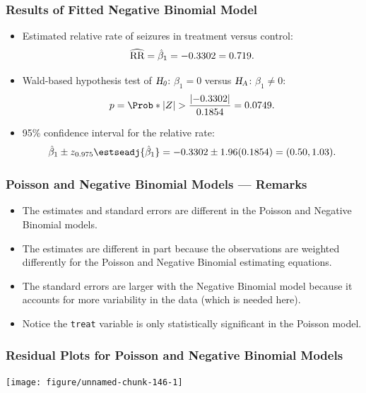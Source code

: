 \documentclass[oneside]{book}\usepackage[]{graphicx}\usepackage[svgnames]{xcolor}
\newenvironment{knitrout}{}{} %
\let\exp\relax%
\newcommand{\HN}{\textsl{H}_{\textsl{0}}}%
\newcommand{\HA}{\textsl{H}_{\textsl{A}}}%
\newcommand{\RR}{\text{RR}}%
\DeclarePairedDelimiter\abs{\lvert}{\rvert}
\begin{document}
\subsubsection*{Results of Fitted Negative Binomial Model}
\begin{itemize}
      \item Estimated relative rate of seizures in treatment versus control:
            \[ \widehat{\RR}=\exp{\hat{\beta}_1}=\exp{-0.3302}=0.719. \]
      \item Wald-based hypothesis test of $ \HN $: $ \beta_1=0 $ versus $ \HA $: $ \beta_1\ne 0 $:
            \[ p=\Prob*{\abs{Z}>\frac{\abs{-0.3302}}{0.1854}}=0.0749. \]
      \item 95\% confidence interval for the relative rate:
            \[ \exp{\hat{\beta}_1\pm z_{0.975}\estseadj{\hat{\beta}_1}}=\exp{-0.3302\pm 1.96(0.1854)}=(0.50,1.03). \]
\end{itemize}
\subsubsection*{Poisson and Negative Binomial Models --- Remarks}
\begin{itemize}
      \item The estimates and standard errors are different in the Poisson and Negative
            Binomial models.
      \item The estimates are different in part because the observations are weighted
            differently for the Poisson and Negative Binomial estimating equations.
      \item The standard errors are larger with the Negative Binomial model because it
            accounts for more variability in the data (which is needed here).
      \item Notice the \texttt{treat} variable is only statistically significant in the Poisson model.
\end{itemize}
\subsubsection*{Residual Plots for Poisson and Negative Binomial Models}
\begin{knitrout}
\color{fgcolor}

{\centering \texttt{[image: figure/unnamed-chunk-146-1]} 

}


\end{knitrout}
\end{document}
